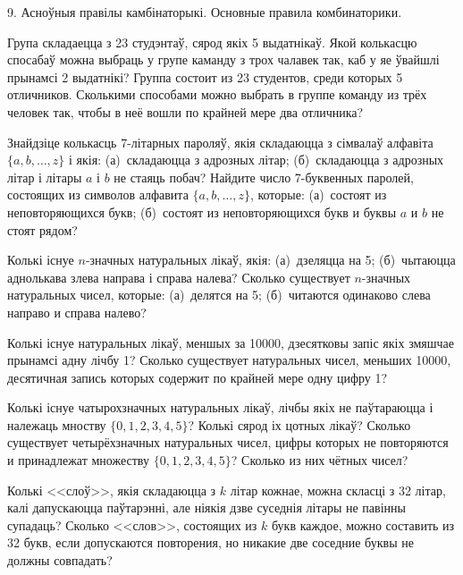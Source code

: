 \documentclass[12pt, a4paper]{article}
\begin{document}
\biLangHeader
{9. Асноўныя правілы камбінаторыкі.}
{Основные правила комбинаторики.}

\begin{problemList}

\problemItemSimple
{Група складаецца з 23 студэнтаў, сярод якіх 5 выдатнікаў. Якой колькасцю спосабаў можна выбраць у групе каманду з трох чалавек так, каб у яе ўвайшлі прынамсі 2 выдатнікі?}
{Группа состоит из 23 студентов, среди которых 5 отличников. Сколькими способами можно выбрать в группе команду из трёх человек так, чтобы в неё вошли по крайней мере два отличника?}

\bigskip

\problemItemSimple
{Знайдзіце колькасць 7-літарных пароляў, якія складаюцца з сімвалаў алфавіта $\{a, b, \dots, z \}$ і якія: (а)~складаюцца з адрозных літар; (б)~складаюцца з адрозных літар і літары $a$ і $b$ не стаяць побач?}
{Найдите число 7-буквенных паролей, состоящих из символов алфавита $\{a, b, \dots, z \}$, которые: (а)~состоят из неповторяющихся букв; (б)~состоят из неповторяющихся букв и буквы $a$ и $b$ не стоят рядом?}

\bigskip

\problemItemSimple
{Колькі існуе $n$-значных натуральных лікаў, якія: (а)~дзеляцца на 5; (б)~чытаюцца аднолькава злева направа і справа налева?}
{Сколько существует $n$-значных натуральных чисел, которые: (а)~делятся на 5; (б)~читаются одинаково слева направо и справа налево?}

\bigskip

\problemItemSimple
{Колькі існуе натуральных лікаў, меншых за 10000, дзесятковы запіс якіх змяшчае прынамсі адну лічбу 1?}
{Сколько существует натуральных чисел, меньших 10000, десятичная запись которых содержит по крайней мере одну цифру 1?}

\bigskip

\problemItemSimple
{Колькі існуе чатырохзначных натуральных лікаў, лічбы якіх не паўтараюцца і належаць мноству $\{0, 1, 2, 3, 4, 5\}$? Колькі сярод іх цотных лікаў?}
{Сколько существует четырёхзначных натуральных чисел, цифры которых не повторяются и принадлежат множеству $\{0, 1, 2, 3, 4, 5\}$? Сколько из них чётных чисел?}

\bigskip

\problemItemSimple
{Колькі <<слоў>>, якія складаюцца з $k$ літар кожнае, можна скласці з 32 літар, калі дапускаюцца паўтарэнні, але ніякія дзве суседнія літары не павінны супадаць?}
{Сколько <<слов>>, состоящих из $k$ букв каждое, можно составить из 32 букв, если допускаются повторения, но никакие две соседние буквы не должны совпадать?}


\end{problemList}
\end{document}
